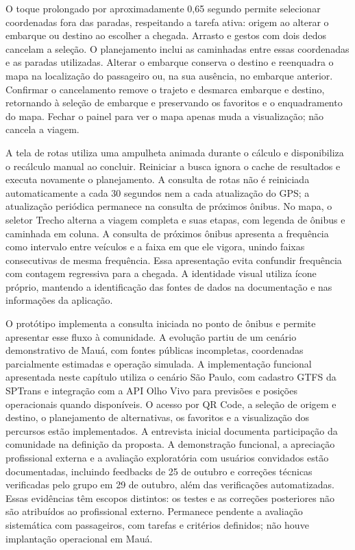 \documentclass[12pt,oneside,a4paper,brazil,chapter=TITLE]{abntex2}
\begin{document}
O toque prolongado por aproximadamente 0,65 segundo permite selecionar coordenadas fora das paradas, respeitando a tarefa ativa: origem ao alterar o embarque ou destino ao escolher a chegada. Arrasto e gestos com dois dedos cancelam a seleção. O planejamento inclui as caminhadas entre essas coordenadas e as paradas utilizadas. Alterar o embarque conserva o destino e reenquadra o mapa na localização do passageiro ou, na sua ausência, no embarque anterior. Confirmar o cancelamento remove o trajeto e desmarca embarque e destino, retornando à seleção de embarque e preservando os favoritos e o enquadramento do mapa. Fechar o painel para ver o mapa apenas muda a visualização; não cancela a viagem.

A tela de rotas utiliza uma ampulheta animada durante o cálculo e disponibiliza o recálculo manual ao concluir. Reiniciar a busca ignora o cache de resultados e executa novamente o planejamento. A consulta de rotas não é reiniciada automaticamente a cada 30 segundos nem a cada atualização do GPS; a atualização periódica permanece na consulta de próximos ônibus. No mapa, o seletor Trecho alterna a viagem completa e suas etapas, com legenda de ônibus e caminhada em coluna. A consulta de próximos ônibus apresenta a frequência como intervalo entre veículos e a faixa em que ele vigora, unindo faixas consecutivas de mesma frequência. Essa apresentação evita confundir frequência com contagem regressiva para a chegada. A identidade visual utiliza ícone próprio, mantendo a identificação das fontes de dados na documentação e nas informações da aplicação.

O protótipo implementa a consulta iniciada no ponto de ônibus e permite apresentar esse fluxo à comunidade. A evolução partiu de um cenário demonstrativo de Mauá, com fontes públicas incompletas, coordenadas parcialmente estimadas e operação simulada. A implementação funcional apresentada neste capítulo utiliza o cenário São Paulo, com cadastro GTFS da SPTrans e integração com a API Olho Vivo para previsões e posições operacionais quando disponíveis. O acesso por QR Code, a seleção de origem e destino, o planejamento de alternativas, os favoritos e a visualização dos percursos estão implementados. A entrevista inicial documenta participação da comunidade na definição da proposta. A demonstração funcional, a apreciação profissional externa e a avaliação exploratória com usuários convidados estão documentadas, incluindo feedbacks de 25 de outubro e correções técnicas verificadas pelo grupo em 29 de outubro, além das verificações automatizadas. Essas evidências têm escopos distintos: os testes e as correções posteriores não são atribuídos ao profissional externo. Permanece pendente a avaliação sistemática com passageiros, com tarefas e critérios definidos; não houve implantação operacional em Mauá.
\end{document}
